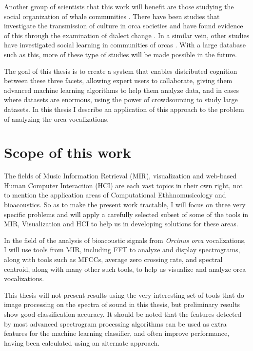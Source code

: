\documentclass[12pt,oneside]{book}
\begin{document}
Another group of scientists that this work will benefit are those
studying the social organization of whale communities
\cite{bigg1990orca} \cite{deecke2000dialect}
\cite{thomsen2002significance} \cite{weiss2006vocal}
\cite{weiss2007intra}.  There have been studies that investigate the
transmission of culture \cite{rendell2001culture} in orca societies
\cite{deecke2000dialect} and have found evidence of this through the
examination of dialect change \cite{riesch2006stability}.  In a
similar vein, other studies have investigated social learning
\cite{janik2000social} in communities of orcas \cite{weiss2007intra}.
With a large database such as this, more of these type of studies will
be made possible in the future.

The goal of this thesis is to create a system that enables distributed
cognition between these three facets, allowing expert users to
collaborate, giving them advanced machine learning algorithms to help
them analyze data, and in cases where datasets are enormous, using the
power of crowdsourcing \cite{surowiecki05crowdsourcing} to study large
datasets.  In this thesis I describe an application of this approach
to the problem of analyzing the orca vocalizations.

%
%
\section{Scope of this work}
\label{section:introduction:scopeOfThisWork}

The fields of Music Information Retrieval (MIR), visualization and
web-based Human Computer Interaction (HCI) are each vast topics in
their own right, not to mention the application areas of Computational
Ethhnomusicology\cite{tzanetakis2008ce} and bioacoustics.  So as to
make the present work tractable, I will focus on three very specific
problems and will apply a carefully selected subset of some of the
tools in MIR, Visualization and HCI to help us in developing solutions
for these areas.

In the field of the analysis of bioacoustic signals from
\textit{Orcinus orca} vocalizations, I will use tools from MIR,
including FFT to analyze and display spectrograms, along with tools
such as MFCCs, average zero crossing rate, and spectral centroid,
along with many other such tools, to help us visualize and analyze
orca vocalizations.

This thesis will not present results using the very interesting set of
tools that do image processing on the spectra of sound in this thesis,
but preliminary results show good classification accuracy.  It should
be noted that the features detected by most advanced spectrogram
processing algorithms can be used as extra features for the machine
learning classifier, and often improve performance, having been
calculated using an alternate approach.
\end{document}
